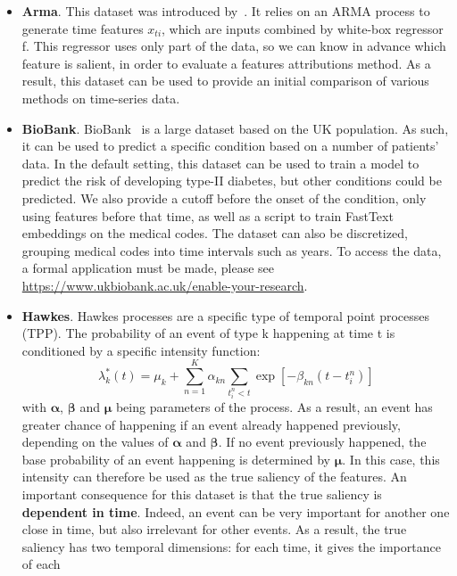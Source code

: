 \begin{itemize}
    \item \textbf{Arma}.
        This dataset was introduced by~\citep{crabbe2021explaining}.
        It relies on an ARMA process to generate time features $x_{ti}$, which are inputs combined by white-box
        regressor f.
        This regressor uses only part of the data, so we can know in advance which feature is salient, in order to
        evaluate a features attributions method.
        As a result, this dataset can be used to provide an initial comparison of various methods on time-series data.
    \item \textbf{BioBank}.
        BioBank~\citep{sudlow2015uk} is a large dataset based on the UK population.
        As such, it can be used to predict a specific condition based on a number of patients' data.
        In the default setting, this dataset can be used to train a model to predict the risk of developing type-II
        diabetes, but other conditions could be predicted.
        We also provide a cutoff before the onset of the condition, only using features before that time, as well as
        a script to train FastText~\citep{bojanowski2017enriching} embeddings on the medical codes.
        The dataset can also be discretized, grouping medical codes into time intervals such as years.
        To access the data, a formal application must be made, please see
        \url{https://www.ukbiobank.ac.uk/enable-your-research}.
    \item \textbf{Hawkes}.
        Hawkes processes are a specific type of temporal point processes (TPP).
        The probability of an event of type k happening at time t is conditioned by a specific intensity function:
        \[ \lambda^*_k(t) = \mu_k + \sum_{n=1}^K \alpha_{kn} \sum_{t_i^n < t} \exp \left[ -\beta_{kn} (t - t_i^n) \right] \]
        with $\bm{\alpha}$, $\bm{\beta}$ and $\bm{\mu}$ being parameters of the process.
        As a result, an event has greater chance of happening if an event already happened previously, depending on the
        values of $\bm{\alpha}$ and $\bm{\beta}$.
        If no event previously happened, the base probability of an event happening is determined by $\bm{\mu}$.
        In this case, this intensity can therefore be used as the true saliency of the features.
        An important consequence for this dataset is that the true saliency is \textbf{dependent in time}.
        Indeed, an event can be very important for another one close in time, but also irrelevant for other events.
        As a result, the true saliency has two temporal dimensions: for each time, it gives the importance of each

\end{itemize}
